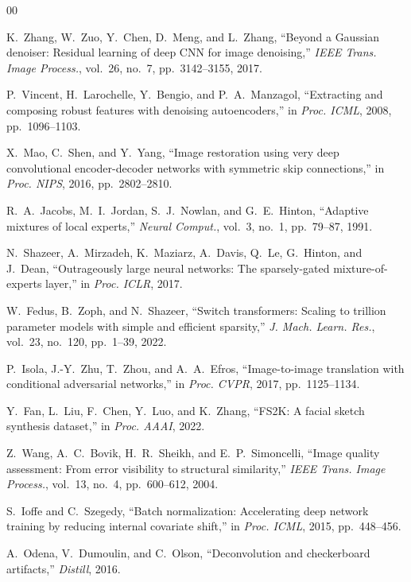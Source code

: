 \documentclass[conference]{IEEEtran}
\begin{document}
\begin{thebibliography}{00}

K.~Zhang, W.~Zuo, Y.~Chen, D.~Meng, and L.~Zhang, ``Beyond a Gaussian denoiser: Residual learning of deep CNN for image denoising,'' \textit{IEEE Trans. Image Process.}, vol.~26, no.~7, pp.~3142--3155, 2017.

P.~Vincent, H.~Larochelle, Y.~Bengio, and P.~A.~Manzagol, ``Extracting and composing robust features with denoising autoencoders,'' in \textit{Proc. ICML}, 2008, pp.~1096--1103.

X.~Mao, C.~Shen, and Y.~Yang, ``Image restoration using very deep convolutional encoder-decoder networks with symmetric skip connections,'' in \textit{Proc. NIPS}, 2016, pp.~2802--2810.

R.~A.~Jacobs, M.~I.~Jordan, S.~J.~Nowlan, and G.~E.~Hinton, ``Adaptive mixtures of local experts,'' \textit{Neural Comput.}, vol.~3, no.~1, pp.~79--87, 1991.

N.~Shazeer, A.~Mirzadeh, K.~Maziarz, A.~Davis, Q.~Le, G.~Hinton, and J.~Dean, ``Outrageously large neural networks: The sparsely-gated mixture-of-experts layer,'' in \textit{Proc. ICLR}, 2017.

W.~Fedus, B.~Zoph, and N.~Shazeer, ``Switch transformers: Scaling to trillion parameter models with simple and efficient sparsity,'' \textit{J. Mach. Learn. Res.}, vol.~23, no.~120, pp.~1--39, 2022.

P.~Isola, J.-Y.~Zhu, T.~Zhou, and A.~A.~Efros, ``Image-to-image translation with conditional adversarial networks,'' in \textit{Proc. CVPR}, 2017, pp.~1125--1134.

Y.~Fan, L.~Liu, F.~Chen, Y.~Luo, and K.~Zhang, ``FS2K: A facial sketch synthesis dataset,'' in \textit{Proc. AAAI}, 2022.

Z.~Wang, A.~C.~Bovik, H.~R.~Sheikh, and E.~P.~Simoncelli, ``Image quality assessment: From error visibility to structural similarity,'' \textit{IEEE Trans. Image Process.}, vol.~13, no.~4, pp.~600--612, 2004.

S.~Ioffe and C.~Szegedy, ``Batch normalization: Accelerating deep network training by reducing internal covariate shift,'' in \textit{Proc. ICML}, 2015, pp.~448--456.

A.~Odena, V.~Dumoulin, and C.~Olson, ``Deconvolution and checkerboard artifacts,'' \textit{Distill}, 2016.

\end{thebibliography}
\end{document}
